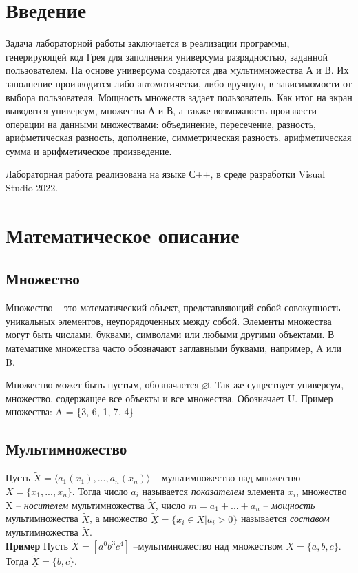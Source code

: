 \documentclass[10pt,a4paper,final]{article} %
\begin{document}
\tableofcontents

\newpage
\section* {Введение}
\par Задача лабораторной работы заключается в реализации программы, генерирующей код Грея для заполнения универсума разрядностью, заданной пользователем. На основе универсума создаются два мультимножества А и В. Их заполнение производится либо автомотически, либо вручную, в зависимомости от выбора пользователя. Мощность множеств задает пользователь. Как итог на экран выводятся универсум, множества А и В, а также возможность произвести операции на данными множествами:  объединение, пересечение, разность, арифметическая разность, дополнение, симметрическая разность, арифметическая сумма и арифметическое произведение.
\par Лабораторная работа реализована на языке С++, в среде разработки Visual Studio 2022.

\newpage
\section {Математическое описание}
\subsection {Множество}
\par Множество -- это математический объект, представляющий собой совокупность уникальных элементов, неупорядоченных между собой. Элементы множества могут быть числами, буквами, символами или любыми другими объектами. В математике множества часто обозначают заглавными буквами, например, A или B.
\par Множество может быть пустым, обозначается $\varnothing$. Так же существует
универсум, множество, содержащее все объекты и все множества. Обозначает
U. Пример множества: A = \{3, 6, 1, 7, 4\}


\subsection {Мультимножество}

\par Пусть $\tilde{X}=\langle a_1(x_1),...,a_n(x_n) \rangle$ -- мультимножество над множество $X=\{x_1,...,x_n\}$. Тогда число $a_i$ называется \textit{показателем} элемента $x_i$, множество X -- \textit{носителем} мультимножества $\tilde{X}$, число $m=a_1+ ...+a_n$ -- \textit{мощность} мультимножества $\tilde{X}$, а множество $\tilde{\underline{X}} = \{x_i \in X | a_i>0 \}$ называется \textit{составом} мультимножества $\tilde{X}$.\\
\textbf{Пример} Пусть $\tilde{X}= [a^0b^3c^4]$ --мультимножество над множеством $X=\{a,b,c\}$. Тогда $\tilde{\underline{X}}= \{b,c\}$.
\end{document}
